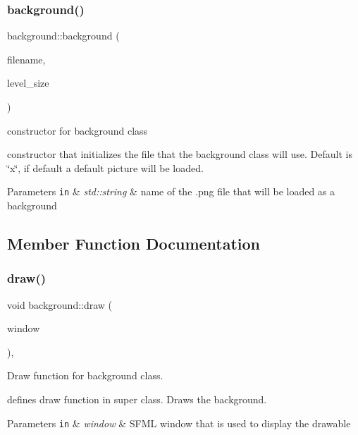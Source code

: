 \subsubsection{\texorpdfstring{background()}{background()}}
{\footnotesize\ttfamily background\+::background (\begin{DoxyParamCaption}\item[{std\+::string}]{filename,  }\item[{sf\+::\+Vector2f}]{level\+\_\+size }\end{DoxyParamCaption})}



constructor for background class 

constructor that initializes the file that the background class will use. Default is \char`\"{}x\char`\"{}, if default a default picture will be loaded.


\begin{DoxyParams}[1]{Parameters}
\mbox{\tt in}  & {\em std\+::string} & name of the .png file that will be loaded as a background \\
\hline
\end{DoxyParams}


\subsection{Member Function Documentation}
\mbox{\label{classbackground_a41736f9a00defad1e84b3a8099c887e2}} 
\subsubsection{\texorpdfstring{draw()}{draw()}}
{\footnotesize\ttfamily void background\+::draw (\begin{DoxyParamCaption}\item[{sf\+::\+Render\+Window \&}]{window }\end{DoxyParamCaption})\hspace{0.3cm}{\ttfamily [override]}, {\ttfamily [virtual]}}



Draw function for background class. 

defines draw function in super class. Draws the background.


\begin{DoxyParams}[1]{Parameters}
\mbox{\tt in}  & {\em window} & S\+F\+ML window that is used to display the drawable \\
\hline
\end{DoxyParams}


